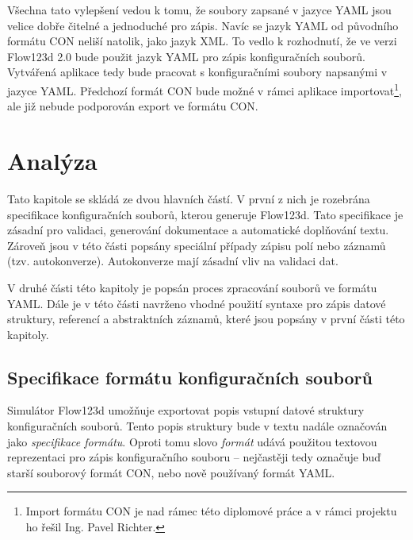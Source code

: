 \documentclass[FM,bw,DP]{tulthesis}
\begin{document}
Všechna tato vylepšení vedou k tomu, že soubory zapsané v jazyce YAML jsou velice dobře čitelné a jednoduché pro zápis. Navíc se jazyk YAML od původního formátu CON neliší natolik, jako jazyk XML. To vedlo k rozhodnutí, že ve verzi Flow123d 2.0 bude použit jazyk YAML pro zápis konfiguračních souborů. Vytvářená aplikace tedy bude pracovat s konfiguračními soubory napsanými v jazyce YAML. Předchozí formát CON bude možné v rámci aplikace importovat\footnote{Import formátu CON je nad rámec této diplomové práce a v rámci projektu ho řešil Ing. Pavel Richter.}, ale již nebude podporován export ve formátu CON.




\chapter{Analýza}

Tato kapitole se skládá ze dvou hlavních částí. V první z nich je rozebrána specifikace konfiguračních souborů, kterou generuje Flow123d. Tato specifikace je zásadní pro validaci, generování dokumentace a automatické doplňování textu. Zároveň jsou v této části popsány speciální případy zápisu polí nebo záznamů (tzv. autokonverze). Autokonverze mají zásadní vliv na validaci dat.

V druhé části této kapitoly je popsán proces zpracování souborů ve formátu YAML. Dále je v této části navrženo vhodné použití syntaxe pro zápis datové struktury, referencí a abstraktních záznamů, které jsou popsány v první části této kapitoly.

\section{Specifikace formátu konfiguračních souborů}

Simulátor Flow123d umožňuje exportovat popis vstupní datové struktury konfiguračních souborů. Tento popis struktury bude v textu nadále označován jako \textit{specifikace formátu}. Oproti tomu slovo \textit{formát} udává použitou textovou reprezentaci pro zápis konfiguračního souboru -- nejčastěji tedy označuje buď starší souborový formát CON, nebo nově používaný formát YAML.
\end{document}
